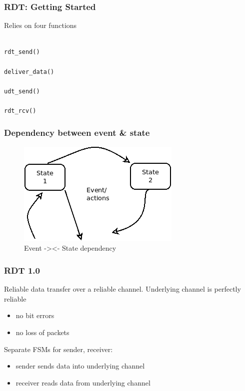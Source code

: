 \documentclass[11pt]{article}
\begin{document}
\subsubsection{RDT: Getting Started}
\label{sec:org57d9635}

Relies on four functions

\begin{verbatim}

rdt_send()

deliver_data()

udt_send()

rdt_rcv()

\end{verbatim}


\subsubsection{Dependency between event \& state}
\label{sec:orgc661cb0}

\begin{figure}[htbp]
\centering
\includegraphics[width=.9\linewidth]{../img/eventStateDependency.png}
\caption{Event -><- State dependency}
\end{figure}


\subsubsection{RDT 1.0}
\label{sec:orgf1a4c0b}
Reliable data transfer over a reliable channel. Underlying channel is
perfectly reliable
\begin{itemize}
\item no bit errors
\item no loss of packets
\end{itemize}

Separate FSMs for sender, receiver:
\begin{itemize}
\item sender sends data into underlying channel
\item receiver reads data from underlying channel
\end{itemize}
\end{document}

